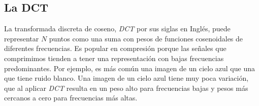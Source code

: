 



\subsection{La DCT}

La transformada discreta de coseno, \emph{DCT} por sus siglas en Inglés, puede
representar $N$ puntos como una suma con pesos de funciones cosenoidales de
diferentes frecuencias. Es popular en compresión porque las señales que
comprimimos tienden a tener una representación con bajas frecuencias
predominantes. Por ejemplo, es más común una imagen de un cielo azul que una
que tiene ruido blanco. Una imagen de un cielo azul tiene muy poca variación,
que al aplicar \emph{DCT} resulta en un peso alto para frecuencias bajas y
pesos más cercanos a cero para frecuencias más altas.


